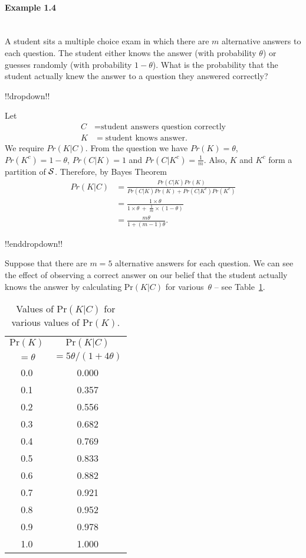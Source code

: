 \clearpage

\paragraph{Example 1.4}{~\\
A student sits a multiple choice exam in which there are $m$
alternative answers to each question. The student either knows the
answer (with probability $\theta$) or guesses randomly (with
probability $1-\theta$). What is the probability that the student
actually knew the answer to a question they answered correctly?
\label{ex:multiple}

!!dropdown!!

Let
        \begin{align*}
        C&=\text{student answers question correctly} \\
        K&=\text{student knows answer}.
        \end{align*}
        We require $Pr(K|C)$. From the question we have $Pr(K)=\theta$,
        $Pr(K^c)=1-\theta$, $Pr(C|K)=1$ and $Pr(C|K^c)=\frac{1}{m}$.  Also,
        $K$ and $K^c$ form a partition of ${\cal S}$. Therefore, by Bayes
        Theorem
        \begin{align*}
        Pr(K|C)&=\frac{Pr(C|K)Pr(K)}{Pr(C|K)Pr(K)+Pr(C|K^c)Pr(K^c)} \\
        &=\frac{1\times\theta}{1\times\theta~+~\frac{1}{m}\times(1-\theta)} \\
        &=\frac{m\theta}{1+(m-1)\theta}.
        \end{align*}

!!enddropdown!!

Suppose that there are $m=5$ alternative answers for each question. We
can see the effect of observing a correct answer on our belief
that the student actually knows the answer by calculating $\text{Pr}(K|C)$
for various~$\theta$ -- see Table~\ref{tab:kc}.}

\begin{table}[h]
\bigskip

\begin{tabular}{|c|c|}
\hline
$\text{Pr}(K)$ & $\text{Pr}(K|C)$ \\
$=\theta$ & $=5\theta/(1+4\theta)$ \\
\hline
0.0 & 0.000 \\
0.1 & 0.357 \\
0.2 & 0.556 \\
0.3 & 0.682 \\
0.4 & 0.769 \\
0.5 & 0.833 \\
0.6 & 0.882 \\
0.7 & 0.921 \\
0.8 & 0.952 \\
0.9 & 0.978 \\
1.0 & 1.000 \\
\hline
\end{tabular}
\caption{Values of $\text{Pr}(K|C)$ for various values of $\text{Pr}(K)$.}
\label{tab:kc}

\end{table}

